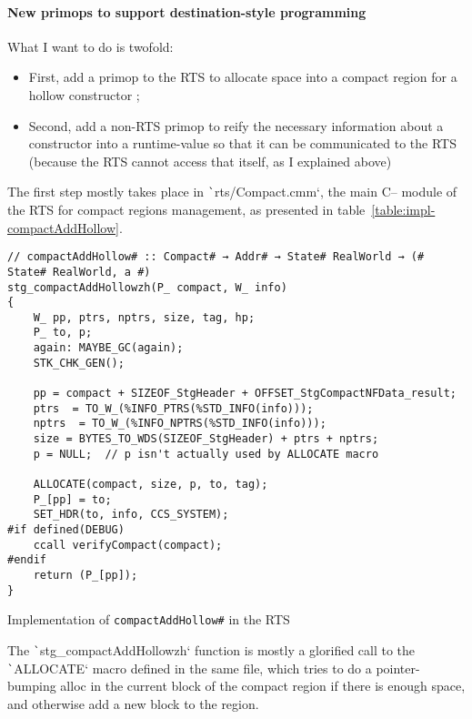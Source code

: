 \documentclass[english]{jflart}
\begin{document}
\paragraph{New primops to support destination-style programming}

What I want to do is twofold:
\begin{itemize}
\item First, add a primop to the RTS to allocate space into a compact region for a hollow constructor ;
\item Second, add a non-RTS primop to reify the necessary information about a constructor into a runtime-value so that it can be communicated to the RTS (because the RTS cannot access that itself, as I explained above)
\end{itemize}

The first step mostly takes place in \texttt`rts/Compact.cmm`, the main C-- module of the RTS for compact regions management, as presented in table~\ref{table:impl-compactAddHollow}.

\begin{table}[H]
\small
\begin{verbatim}
// compactAddHollow# :: Compact# → Addr# → State# RealWorld → (# State# RealWorld, a #)
stg_compactAddHollowzh(P_ compact, W_ info)
{
    W_ pp, ptrs, nptrs, size, tag, hp;
    P_ to, p;
    again: MAYBE_GC(again);
    STK_CHK_GEN();

    pp = compact + SIZEOF_StgHeader + OFFSET_StgCompactNFData_result;
    ptrs  = TO_W_(%INFO_PTRS(%STD_INFO(info)));
    nptrs  = TO_W_(%INFO_NPTRS(%STD_INFO(info)));
    size = BYTES_TO_WDS(SIZEOF_StgHeader) + ptrs + nptrs;
    p = NULL;  // p isn't actually used by ALLOCATE macro

    ALLOCATE(compact, size, p, to, tag);
    P_[pp] = to;
    SET_HDR(to, info, CCS_SYSTEM);
#if defined(DEBUG)
    ccall verifyCompact(compact);
#endif
    return (P_[pp]);
}
\end{verbatim}
\caption{Implementation of \texttt{compactAddHollow\#} in the RTS}
\label{table:impl-compactAddHollow}
\end{table}

The \texttt`stg_compactAddHollowzh` function is mostly a glorified call to the \texttt`ALLOCATE` macro defined in the same file, which tries to do a pointer-bumping alloc in the current block of the compact region if there is enough space, and otherwise add a new block to the region.
\end{document}
